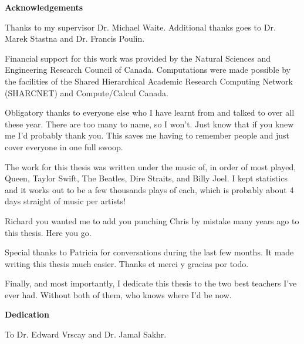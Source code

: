 
\begin{center}\textbf{Acknowledgements}\end{center}
Thanks to my supervisor Dr. Michael Waite. Additional thanks goes to Dr. Marek Stastna and Dr. Francis Poulin. 

Financial support for this work was provided by the Natural Sciences and Engineering Research Council of Canada. Computations were made possible by the facilities of the Shared Hierarchical Academic Research Computing Network (SHARCNET) and Compute/Calcul Canada.

Obligatory thanks to everyone else who I have learnt from and talked to over all these year. There are too many to name, so I won't. Just know that if you knew me I'd probably thank you. This saves me having to remember people and just cover everyone in one full swoop.

The work for this thesis was written under the music of, in order of most played, Queen, Taylor Swift, The Beatles, Dire Straits, and Billy Joel. I kept statistics and it works out to be a few thousands plays of each, which is probably about 4 days straight of music per artists!

Richard you wanted me to add you punching Chris by mistake many years ago to this thesis. Here you go.

Special thanks to Patricia for conversations during the last few months. It made writing this thesis much easier. Thanks et merci y gracias por todo. 

Finally, and most importantly, I dedicate this thesis to the two best teachers I've ever had. Without both of them, who knows where I'd be now. 
\cleardoublepage


\begin{center}\textbf{Dedication}\end{center}
\begin{center}To Dr. Edward Vrscay and Dr. Jamal Sakhr.\end{center}
\cleardoublepage


\renewcommand\contentsname{Table of Contents}
\tableofcontents
\cleardoublepage
{}


